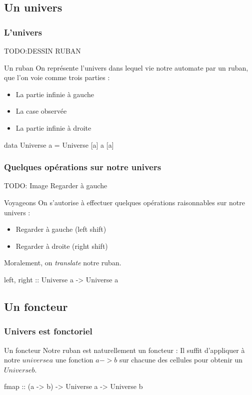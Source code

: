 \documentclass{beamer}
\begin{document}
\subsection{Un univers}
\begin{frame}
\frametitle{L'univers}
TODO:DESSIN RUBAN

\begin{block}{Un ruban}
On représente l'univers dans lequel vie notre automate par un ruban, que l'on voie comme trois parties :

\begin{itemize}
\item La partie infinie à gauche
\item La case observée
\item La partie infinie à droite
\end{itemize}
\end{block}

\begin{block}{}
data Universe a = Universe [a] a [a]
\end{block}
\end{frame}

\begin{frame}
\frametitle{Quelques opérations sur notre univers}

TODO: Image Regarder à gauche
\begin{block}{Voyageons}
On s'autorise à effectuer quelques opérations raisonnables sur notre univers :
\begin{itemize}
\item Regarder à gauche (left shift)
\item Regarder à droite (right shift)
\end{itemize}
\end{block}
\pause
\begin{block}{}
Moralement, on \emph{translate} notre ruban.
\end{block}
\pause
\begin{block}{}
left, right :: Universe a -> Universe a
\end{block}
\end{frame}

\subsection{Un foncteur}
\begin{frame}
\frametitle{Univers est fonctoriel}
\begin{block}{Un foncteur}
Notre ruban est naturellement un foncteur : Il suffit d'appliquer à notre $universe a$ une fonction $a -> b$ sur chacune des cellules pour obtenir un $Universe b$.
\end{block}
\begin{block}{}
fmap :: (a -> b) -> Universe a -> Universe b
\end{block}
\end{frame}
\end{document}
